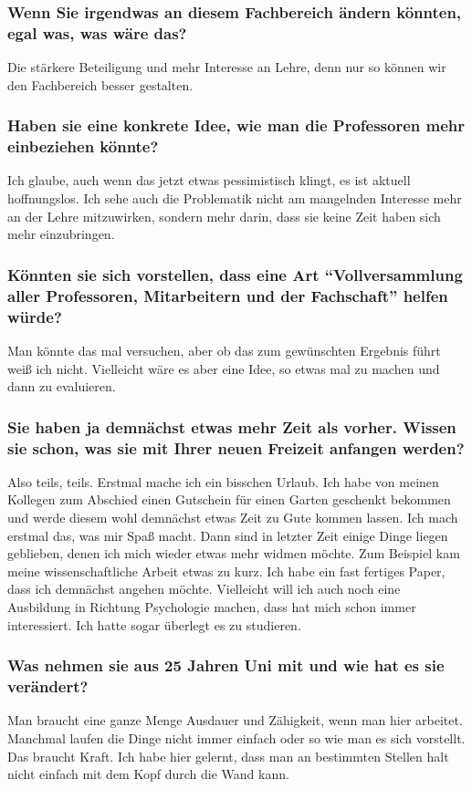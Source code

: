 {    \subsubsection*{Wenn Sie irgendwas an diesem Fachbereich ändern könnten, egal was, was wäre das?}
    Die stärkere Beteiligung und mehr Interesse an Lehre, denn nur so können wir den Fachbereich besser gestalten.
    \subsubsection*{Haben sie eine konkrete Idee, wie man die Professoren mehr einbeziehen könnte?}
    Ich glaube, auch wenn das jetzt etwas pessimistisch klingt, es ist aktuell hoffnungslos. Ich sehe auch die Problematik nicht am mangelnden Interesse mehr an der Lehre mitzuwirken, sondern mehr darin, dass sie keine Zeit haben sich mehr einzubringen.
    \subsubsection*{Könnten sie sich vorstellen, dass eine Art "`Vollversammlung aller Professoren, Mitarbeitern und der Fachschaft"' helfen würde? }
    Man könnte das mal versuchen, aber ob das zum gewünschten Ergebnis führt weiß ich nicht. Vielleicht wäre es aber eine Idee, so etwas mal zu machen und dann zu evaluieren.
    \subsubsection*{Sie haben ja demnächst etwas mehr Zeit als vorher. Wissen sie schon, was sie mit Ihrer neuen Freizeit anfangen werden?}
    Also teils, teils. Erstmal mache ich ein bisschen Urlaub. Ich habe von meinen Kollegen zum Abschied einen Gutschein für einen Garten geschenkt bekommen und werde diesem wohl demnächst etwas Zeit zu Gute kommen lassen. Ich mach erstmal das, was mir Spaß macht. Dann sind in letzter Zeit einige Dinge liegen geblieben, denen ich mich wieder etwas mehr widmen möchte. Zum Beispiel kam meine wissenschaftliche Arbeit etwas zu kurz. Ich habe ein fast fertiges Paper, dass ich demnächst angehen möchte. Vielleicht will ich auch noch eine Ausbildung in Richtung Psychologie machen, dass hat mich schon immer interessiert. Ich hatte sogar überlegt es zu studieren.
    \subsubsection*{Was nehmen sie aus 25 Jahren Uni mit und wie hat es sie verändert?}
    Man braucht eine ganze Menge Ausdauer und Zähigkeit, wenn man hier arbeitet. Manchmal laufen die Dinge nicht immer einfach oder so wie man es sich vorstellt. Das braucht Kraft. Ich habe hier gelernt, dass man an bestimmten Stellen halt nicht einfach mit dem Kopf durch die Wand kann.
}
